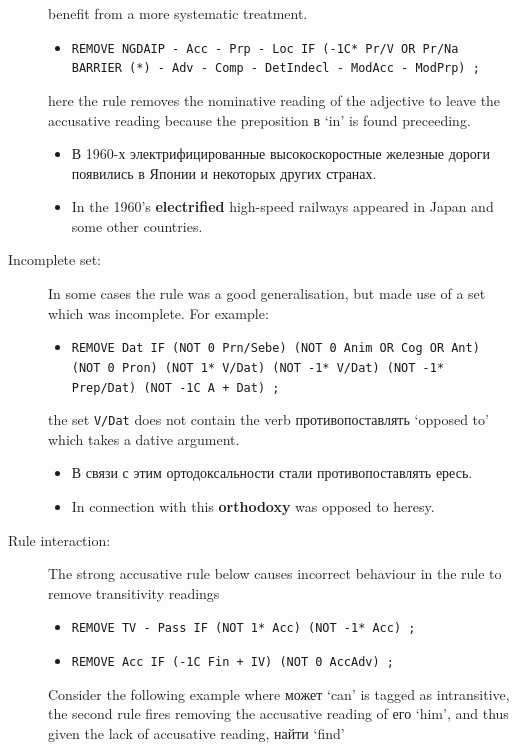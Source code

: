 \documentclass[11pt]{article}
\newcommand{\rus}[1]{\foreignlanguage{russian}{#1}}
\begin{document}
\begin{description}
     benefit from a more systematic treatment.
   \begin{itemize} 
     \item \texttt{REMOVE NGDAIP - Acc - Prp - Loc IF (-1C* Pr/V OR Pr/Na BARRIER (*) - Adv - Comp - DetIndecl - ModAcc - ModPrp) ;}
   \end{itemize}
   here the rule removes the nominative reading of the adjective to leave the accusative reading because the preposition \rus{в} `in'
   is found preceeding. 
   \begin{itemize}
     \item \rus{В 1960-х электрифицированные высокоскоростные железные дороги появились в Японии и некоторых других странах.}
     \item In the 1960's \textbf{electrified} high-speed railways appeared in Japan and some other countries.
   \end{itemize} 
  \item[ Incomplete set:] In some cases the rule was a good generalisation, but made use of a set
    which was incomplete. For example:
   \begin{itemize}
     \item \texttt{REMOVE Dat IF (NOT 0 Prn/Sebe) (NOT 0 Anim OR Cog OR Ant) (NOT 0 Pron) (NOT 1* V/Dat) (NOT -1* V/Dat) (NOT -1* Prep/Dat) (NOT -1C A + Dat) ;}
   \end{itemize} 
   the set \texttt{V/Dat} does not contain the verb \rus{противопоставлять} `opposed to' which takes 
   a dative argument.
   \begin{itemize}
     \item \rus{В связи с этим ортодоксальности стали противопоставлять ересь.}
     \item In connection with this \textbf{orthodoxy} was opposed to heresy. 
   \end{itemize}
  \item[ Rule interaction:] The strong accusative rule below causes incorrect behaviour in the rule to remove transitivity readings
  \begin{itemize}
     \item \texttt{REMOVE TV - Pass IF (NOT 1* Acc) (NOT -1* Acc) ;}
     \item \texttt{REMOVE Acc IF (-1C Fin + IV) (NOT 0 AccAdv) ;}
  \end{itemize}
  Consider the following example where \rus{может} `can' is tagged as intransitive, the second rule fires removing 
  the accusative reading of \rus{его} `him', and thus given the lack of accusative reading, \rus{найти} `find'

\end{description}
\end{document}
